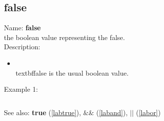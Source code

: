 \subsection{false}
\label{labfalse}
\noindent Name: \textbf{false}\\
the boolean value representing the false.\\
\noindent Description: \begin{itemize}

\item \\textbf{false} is the usual boolean value.\n\end{itemize}
\noindent Example 1: 
\begin{center}\begin{minipage}{15cm}\begin{Verbatim}[frame=single]
\end{Verbatim}
\end{minipage}\end{center}
See also: \textbf{true} (\ref{labtrue}), \textbf{$\&\&$} (\ref{laband}), \textbf{$||$} (\ref{labor})
